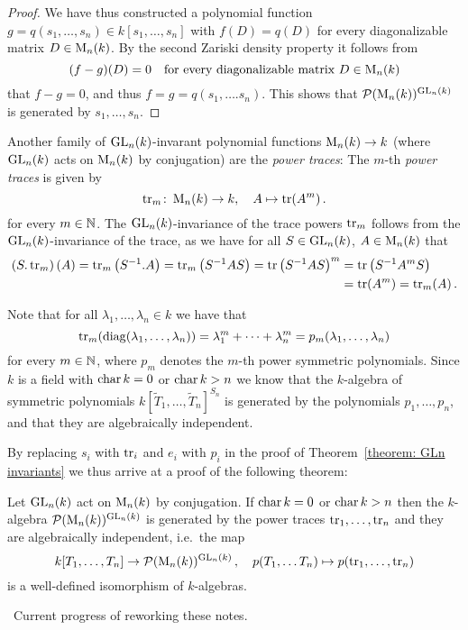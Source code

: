 \begin{proof}
  We have thus constructed a polynomial function $g = q(s_1, \dotsc, s_n) \in k[s_1, \dotsc, s_n]$ with $f(D) = q(D)$ for every diagonalizable matrix $D \in \operatorname{M}_n(k)$.
  By the second Zariski density property it follows from
  \[
    (f - g)(D) = 0
    \quad
    \text{for every diagonalizable matrix $D \in \operatorname{M}_n(k)$}
  \]
  that $f - g = 0$, and thus $f = g = q(s_1, \dotsc. s_n)$.
  This shows that $\mathcal{P}(\operatorname{M}_n(k))^{\operatorname{GL}_n(k)}$ is generated by $s_1, \dotsc, s_n$.
\end{proof}


\begin{fluff}
  Another family of $\operatorname{GL}_n(k)$-invarant polynomial functions $\operatorname{M}_n(k) \to k$ (where $\operatorname{GL}_n(k)$ acts on $\operatorname{M}_n(k)$ by conjugation) are the \emph{power traces}:
  The $m$-th \emph{power traces} is given by
  \[
            \operatorname{tr}_m
    \colon  \operatorname{M}_n(k)
    \to     k,
    \quad    A
    \mapsto \operatorname{tr}(A^m)  \,.
  \]
  for every $m \in \mathbb{N}$.
  The $\operatorname{GL}_n(k)$-invariance of the trace powers $\operatorname{tr}_m$ follows from the $\operatorname{GL}_n(k)$-invariance of the trace, as we have for all $S \in \operatorname{GL}_n(k)$, $A \in \operatorname{M}_n(k)$ that
    \begin{align*}
        \left( S.\operatorname{tr}_m \right)(A)
     =  \operatorname{tr}_m\left( S^{-1}.A \right)
     =  \operatorname{tr}_m\left( S^{-1} A S \right)
     =  \operatorname{tr} \left( S^{-1} A S \right)^m
    &=  \operatorname{tr} \left( S^{-1} A^m S \right) \\
    &=  \operatorname{tr}(A^m)
     =  \operatorname{tr}_m(A) \,.
  \end{align*}
  
  Note that for all $\lambda_1, \dotsc, \lambda_n \in k$ we have that
  \[
      \operatorname{tr}_m(\operatorname{diag}(\lambda_1, \dotsc, \lambda_n))
    = \lambda_1^m + \dotsb + \lambda_n^m
    = p_m(\lambda_1, \dotsc, \lambda_n)
  \]
  for every $m \in \mathbb{N}$, where $p_m$ denotes the $m$-th power symmetric polynomials.
  Since $k$ is a field with $\operatorname{char} k = 0$ or $\operatorname{char} k > n$ we know that the $k$-algebra of symmetric polynomials $k[\tilde{T}_1, \dotsc, \tilde{T}_n]^{S_n}$ is generated by the polynomials $p_1, \dotsc, p_n$, and that they are algebraically independent.
  
  By replacing $s_i$ with $\operatorname{tr}_i$ and $e_i$ with $p_i$ in the proof of Theorem~\ref{theorem: GLn invariants} we thus arrive at a proof of the following theorem:
\end{fluff}


\begin{theorem}
  Let $\operatorname{GL}_n(k)$ act on $\operatorname{M}_n(k)$ by conjugation.
  If $\operatorname{char} k = 0$ or $\operatorname{char} k > n$ then the $k$-algebra $\mathcal{P}(\operatorname{M}_n(k))^{\operatorname{GL}_n(k)}$ is generated by the power traces $\operatorname{tr}_1, \dotsc, \operatorname{tr}_n$ and they are algebraically independent, i.e.\ the map
   \[
            k[T_1, \dotsc, T_n]
    \to     \mathcal{P}(\operatorname{M}_n(k))^{\operatorname{GL}_n(k)} \,,
    \quad   p(T_1, \dotsc T_n)
    \mapsto p(\operatorname{tr}_1, \dotsc, \operatorname{tr}_n)
  \]
  is a well-defined isomorphism of $k$-algebras.
\end{theorem}

\noindent\hrulefill \, Current progress of reworking these notes. \hrulefill




